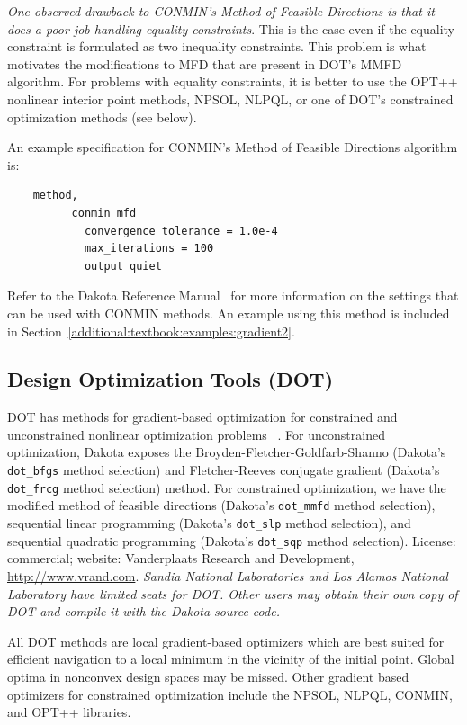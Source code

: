 \emph{One observed drawback to CONMIN's Method of Feasible Directions
is that it does a poor job handling equality constraints}. This is the
case even if the equality constraint is formulated as two inequality
constraints. This problem is what motivates the modifications to MFD
that are present in DOT's MMFD algorithm. For problems with equality
constraints, it is better to use the OPT++ nonlinear interior point
methods, NPSOL, NLPQL, or one of DOT's constrained optimization
methods (see below).

An example specification for CONMIN's Method of Feasible Directions
algorithm is:
\begin{small}
\begin{verbatim}
    method,
          conmin_mfd
            convergence_tolerance = 1.0e-4
            max_iterations = 100
            output quiet
\end{verbatim}
\end{small}

Refer to the Dakota Reference Manual~\cite{RefMan} for more information on
the settings that can be used with CONMIN methods. An example using this method
is included in Section~\ref{additional:textbook:examples:gradient2}.

\subsection{Design Optimization Tools (DOT)}\label{opt:software:dot}

DOT has methods for gradient-based optimization for constrained and
unconstrained nonlinear optimization problems ~\cite{Van95}.  For
unconstrained optimization, Dakota exposes the
Broyden-Fletcher-Goldfarb-Shanno (Dakota's \texttt{dot\_bfgs} method
selection) and Fletcher-Reeves conjugate gradient (Dakota's
\texttt{dot\_frcg} method selection) method.  For constrained
optimization, we have the modified method of feasible directions
(Dakota's \texttt{dot\_mmfd} method selection), sequential linear
programming (Dakota's \texttt{dot\_slp} method selection), and
sequential quadratic programming (Dakota's \texttt{dot\_sqp} method
selection).  License: commercial; website: Vanderplaats Research and
Development, \url{http://www.vrand.com}.  {\em Sandia National
  Laboratories and Los Alamos National Laboratory have limited seats
  for DOT. Other users may obtain their own copy of DOT and compile it
  with the Dakota source code.}

All DOT methods are local gradient-based optimizers which are best
suited for efficient navigation to a local minimum in the vicinity of
the initial point. Global optima in nonconvex design spaces may be
missed. Other gradient based optimizers for constrained optimization
include the NPSOL, NLPQL, CONMIN, and OPT++ libraries.

